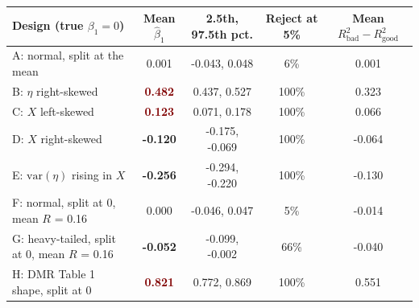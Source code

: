 \begin{tabular}{@{}lcccc@{}}
\toprule
Design (true $\beta_1 = 0$) & Mean $\hat\beta_1$ & 2.5th, 97.5th pct. & Reject at 5\% & Mean $R^2_{\mathrm{bad}} - R^2_{\mathrm{good}}$ \\
\midrule
A: normal, split at the mean & 0.001 & -0.043, 0.048 & 6\% & 0.001 \\
B: \(\eta\) right-skewed & \textcolor{Maroon}{\bfseries 0.482} & 0.437, 0.527 & 100\% & 0.323 \\
C: \(X\) left-skewed & \textcolor{Maroon}{\bfseries 0.123} & 0.071, 0.178 & 100\% & 0.066 \\
D: \(X\) right-skewed & \textcolor{DeepNavy}{\bfseries -0.120} & -0.175, -0.069 & 100\% & -0.064 \\
E: \(\mathrm{var}(\eta)\) rising in \(X\) & \textcolor{DeepNavy}{\bfseries -0.256} & -0.294, -0.220 & 100\% & -0.130 \\
F: normal, split at 0, mean \(R\) = 0.16 & 0.000 & -0.046, 0.047 & 5\% & -0.014 \\
G: heavy-tailed, split at 0, mean \(R\) = 0.16 & \textcolor{DeepNavy}{\bfseries -0.052} & -0.099, -0.002 & 66\% & -0.040 \\
H: DMR Table 1 shape, split at 0 & \textcolor{Maroon}{\bfseries 0.821} & 0.772, 0.869 & 100\% & 0.551 \\
\bottomrule
\end{tabular}
